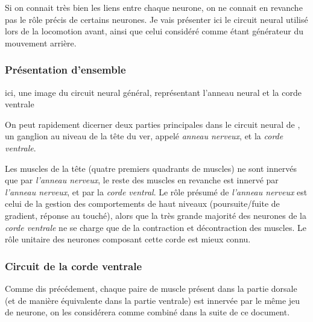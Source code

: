 Si on connait très bien les liens entre chaque neurone, on ne connait en
revanche pas le rôle précis de certains neurones. Je vais présenter ici le
circuit neural utilisé lors de la locomotion avant, ainsi que celui
considéré comme étant générateur du mouvement arrière.

\subsubsection{Présentation d'ensemble} %
\label{ssub:Présentation d'ensemble}

\begin{center}
   ici, une image du circuit neural général, représentant l'anneau neural et la corde ventrale
\end{center}

On peut rapidement dicerner deux parties principales dans le circuit neural de
\celeg{}, un ganglion au niveau de la tête du ver, appelé \textit{anneau
nerveux}, et la \textit{corde ventrale}.

Les muscles de la tête (quatre premiers quadrants de muscles) ne sont innervés que
par \textit{l'anneau nerveux}, le reste des muscles en revanche est innervé
par \textit{l'anneau nerveux}, et par la \textit{corde ventral}.  Le rôle
présumé de \textit{l'anneau nerveux} est celui de la gestion des comportements
de haut niveaux (poursuite/fuite de gradient, réponse au touché), alors que la
très grande majorité des neurones de la \textit{corde ventrale} ne se charge que
de la contraction et décontraction des muscles. Le rôle unitaire des neurones
composant cette corde est mieux connu.


\subsubsection{Circuit de la corde ventrale} %
\label{ssub:Circuit de la corde ventrale}

Comme dis précédement, chaque paire de muscle présent dans la partie dorsale
(et de manière équivalente dans la partie ventrale) est innervée par le même
jeu de neurone, on les considérera comme combiné dans la suite de ce document.

